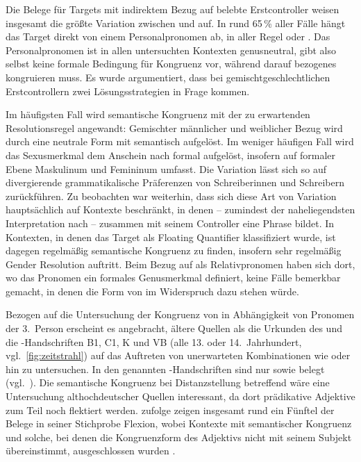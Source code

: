 Die Belege für Targets mit indirektem Bezug auf belebte Erstcontroller weisen
insgesamt die größte Variation zwischen  und  auf. In
rund 65\,\% aller Fälle hängt das Target direkt von einem Personalpronomen ab,
in aller Regel  oder . Das Personalpronomen ist in allen
untersuchten Kontexten genusneutral, gibt also selbst keine formale Bedingung
für Kongruenz vor, während darauf bezogenes  kongruieren muss. Es
wurde argumentiert, dass bei gemischtgeschlechtlichen Erstcontrollern zwei
Lösungsstrategien in Frage kommen.

Im häufigsten Fall wird semantische Kongruenz mit der zu erwartenden
Resolutionsregel angewandt: Gemischter männlicher und weiblicher Bezug wird
durch eine neutrale Form mit \mbox{} semantisch aufgelöst. Im weniger
häufigen Fall wird das Sexusmerkmal dem Anschein nach formal aufgelöst,
insofern  auf formaler Ebene Maskulinum und Femininum umfasst. Die
Variation lässt sich so auf divergierende grammatikalische Präferenzen von
Schreiberinnen und Schreibern zurück\-führen. Zu beobachten war weiterhin, dass
sich diese Art von Variation hauptsächlich auf Kontexte beschränkt, in denen
 -- zumindest der naheliegendsten Interpretation nach -- zusammen
mit seinem Controller eine Phrase bildet. In Kontexten, in denen das Target als
Floating Quantifier klassifiziert wurde, ist dagegen regelmäßig semantische
Kongruenz zu finden, insofern sehr regelmäßig Gender Resolution auftritt. Beim
Bezug auf  als Relativpronomen haben sich dort, wo das Pronomen
ein formales Genusmerkmal definiert, keine Fälle bemerkbar gemacht, in denen
die Form von  im Widerspruch dazu stehen würde.

Bezogen auf die Untersuchung der Kongruenz von  in Abhängigkeit von
Pro\-nomen der 3.~Person erscheint es angebracht, ältere Quellen als die
Urkunden des \CAO{} und die \KC{}-Handschriften B1, C1, K und VB (alle 13. oder
14.~Jahrhundert, vgl.~\cref{fig:zeitstrahl}) auf das Auftreten von unerwarteten
Kombinationen wie  oder  hin zu untersuchen.
In den genannten \KC{}-Handschriften sind nur  sowie
 belegt (vgl.~). Die
semantische Kongruenz bei Distanz\-stellung betreffend wäre eine Untersuchung
althochdeutscher Quellen interessant, da dort prädikative Adjektive zum Teil
noch flektiert werden. \citet[310--311]{fleischer2007} zufolge zeigen insgesamt
rund ein Fünftel der Belege in seiner Stichprobe Flexion, wobei Kontexte mit
semantischer Kongruenz und solche, bei denen die Kongruenzform des Adjektivs
nicht mit seinem Subjekt übereinstimmt, ausgeschlossen wurden
\autocite[304]{fleischer2007}.

